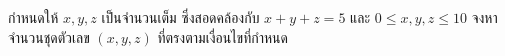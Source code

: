 ﻿%
\question กำหนดให้ $x, y, z$ เป็นจำนวนเต็ม ซึ่งสอดคล้องกับ $x+y+z=5$ และ $0 \leq x,y,z \leq 10$ จงหาจำนวนชุดตัวเลข $(x, y, z)$ ที่ตรงตามเงื่อนไขที่กำหนด
\newline
{}
